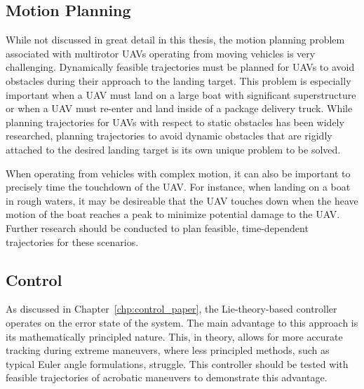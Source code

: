 \subsection{Motion Planning}
\label{sec:future_motion_planning}
While not discussed in great detail in this thesis, the motion planning problem
associated with multirotor UAVs operating from moving vehicles is very
challenging.
Dynamically feasible trajectories must be planned for UAVs to avoid
obstacles during their approach to the landing target.
This problem is especially important when a UAV must land on a large boat
with significant superstructure or when a UAV must re-enter and land inside of a
package delivery truck. While planning trajectories for UAVs with respect to
static obstacles has been widely researched, planning trajectories to avoid
dynamic obstacles that are rigidly attached to the desired landing target is its
own unique problem to be solved.

When operating from vehicles with complex motion, 
it can also be important to precisely time the touchdown of the UAV.
For instance, when landing on a boat in rough
waters, it may be desireable that the UAV touches down when the heave motion of the
boat reaches a peak to minimize potential damage to the UAV.
Further research should be conducted to plan feasible, time-dependent
trajectories for these scenarios.



\subsection{Control}
As discussed in Chapter~\ref{chp:control_paper}, the Lie-theory-based controller
operates on the error state of the system.
The main advantage to this approach is its mathematically principled nature.
This, in
theory, allows for more accurate tracking during extreme maneuvers, where
less principled methods, such as typical Euler angle formulations, struggle.
This controller should be tested with feasible trajectories of acrobatic
maneuvers to demonstrate this advantage.


